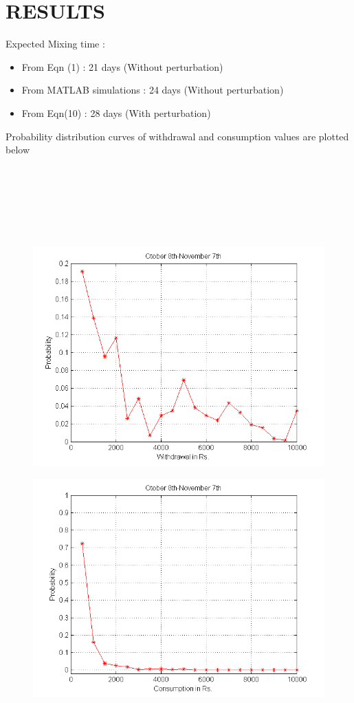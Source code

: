 \documentclass[12pt]{article}
\begin{document}
\section{RESULTS}

Expected Mixing time :
\begin{itemize}
\item From Eqn (1) : 21 days (Without perturbation)
\item From MATLAB simulations : 24 days (Without perturbation)
\item From Eqn(10) : 28 days (With perturbation)
\end{itemize}

Probability distribution curves of withdrawal and consumption values are plotted below\\ \\ \\ \\ \\ \\ \\


\begin{figure}
	\centering
	\includegraphics[scale=0.65]{WOCT.png}
	\caption{}
	\label{fig:fig1}
\end{figure}
\begin{figure}
	\centering
	\includegraphics[scale=0.65]{COCT.png}
	\caption{}
	\label{fig:fig2}
\end{figure}
\end{document}
